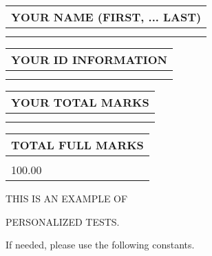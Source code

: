 \documentclass[12pt]{article}
\begin{document}
 
 
   
   
\newpage 
\setcounter{page}{ 
    26001 } 
   
   
   
   
\noindent\begin{tabular}{|l|}
\hline
YOUR NAME (FIRST, ... LAST)  \\
\hline
 \\ 
 \\ 
\hline
\end{tabular}
\hspace{0.05in} \begin{tabular}{|l|}
\hline
 YOUR   ID   INFORMATION  \\
\hline
 \\ 
 \\ 
\hline
\end{tabular}
   
   
\vspace{0.2in}\noindent\begin{tabular}{|l|}
\hline
YOUR TOTAL MARKS  \\
\hline
 \\ 
 \\ 
\hline
\end{tabular}
\hspace{0.05in} \begin{tabular}{|l|}
\hline
TOTAL FULL MARKS  \\
\hline
 \\ 
100.00 \\
\hline
\end{tabular}
   
   
 \vspace{0.2in}
 
 
{\Huge  THIS IS AN EXAMPLE OF}
 
{\Huge  PERSONALIZED TESTS. }
 
If needed, please use the following constants.
 
 
 
\end{document}
